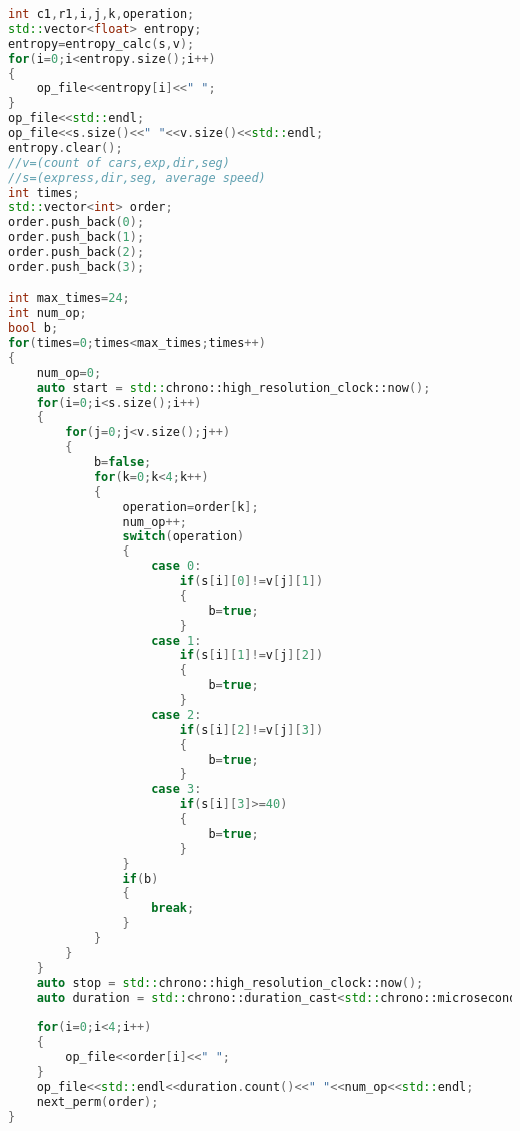 \begin{lstlisting}[language=C++, caption=SegToll, label={lst:SegToll}]
int c1,r1,i,j,k,operation;
std::vector<float> entropy;
entropy=entropy_calc(s,v);
for(i=0;i<entropy.size();i++)
{
    op_file<<entropy[i]<<" ";
}
op_file<<std::endl;
op_file<<s.size()<<" "<<v.size()<<std::endl;
entropy.clear();
//v=(count of cars,exp,dir,seg)
//s=(express,dir,seg, average speed)
int times;
std::vector<int> order;
order.push_back(0);
order.push_back(1);
order.push_back(2);
order.push_back(3);

int max_times=24;
int num_op;
bool b;
for(times=0;times<max_times;times++)
{
    num_op=0;
    auto start = std::chrono::high_resolution_clock::now();
    for(i=0;i<s.size();i++)
    {
        for(j=0;j<v.size();j++)
        {
            b=false;
            for(k=0;k<4;k++)
            {
                operation=order[k];
                num_op++;
                switch(operation)
                {
                    case 0:
                        if(s[i][0]!=v[j][1])
                        {
                            b=true;
                        }
                    case 1:
                        if(s[i][1]!=v[j][2])
                        {
                            b=true;
                        }
                    case 2:
                        if(s[i][2]!=v[j][3])
                        {
                            b=true;
                        }
                    case 3:
                        if(s[i][3]>=40)
                        {
                            b=true;
                        }
                }
                if(b)
                {
                    break;
                }
            }
        }
    }
    auto stop = std::chrono::high_resolution_clock::now(); 
    auto duration = std::chrono::duration_cast<std::chrono::microseconds>(stop - start);
    
    for(i=0;i<4;i++)
    {
        op_file<<order[i]<<" ";
    }
    op_file<<std::endl<<duration.count()<<" "<<num_op<<std::endl;
    next_perm(order);
}
\end{lstlisting}

